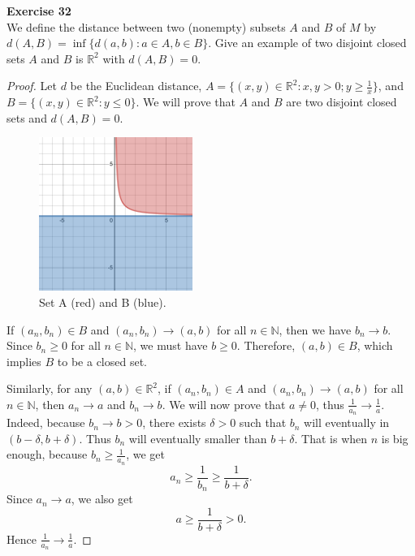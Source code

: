 \documentclass[12pt, a4paper]{article}
\theoremstyle{plain}
\newcommand{\N}{\mathbb{N}}
\newcommand{\R}{\mathbb{R}}
\newenvironment{exercise}[2][Exercise]
    { \begin{mdframed}[backgroundcolor=gray!20] \textbf{#1 #2} \\}
    {  \end{mdframed}}
\begin{document}
\begin{exercise}{32}
We define the distance between two (nonempty) subsets $A$ and $B$ of $M$ by $d(A,B)=\inf\{d(a,b):a\in A, b\in B\}$. Give an example of two disjoint closed sets $A$ and $B$ is $\R^2$ with $d(A,B)=0$.
\end{exercise}
    \begin{proof}
    Let $d$ be the Euclidean distance, $A=\{(x,y)\in\R^2: x,y> 0; y\geq \frac{1}{x}\}$, and $B=\{(x,y)\in \R^2:y\leq 0\}$. We will prove that $A$ and $B$ are two disjoint closed sets and $d(A,B)=0$.
    \begin{figure}[h]
        \centering
        \includegraphics[width=5cm]{Exercise 32.png}
        \caption{Set A (red) and B (blue).}
        \label{fig:my_label}
    \end{figure}
    
    If $(a_n,b_n)\in B$ and $(a_n,b_n)\rightarrow (a,b)$ for all $n\in \N$, then we have $b_n\rightarrow b$. Since $b_n\geq 0$ for all $n\in\N$, we must have $b\geq 0$. Therefore, $(a,b)\in B$, which implies $B$ to be a closed set.
    
    Similarly, for any $(a,b)\in \R^2$, if $(a_n,b_n)\in A$ and $(a_n,b_n)\rightarrow (a,b)$ for all $n\in\N$, then $a_n\rightarrow a$ and $b_n\rightarrow b$. We will now prove that $a\neq 0$, thus $\frac{1}{a_n}\rightarrow\frac{1}{a}$. Indeed, because $b_n\rightarrow b>0$, there exists $\delta>0$ such that $b_n$ will eventually in $(b-\delta, b+\delta)$. Thus $b_n$ will eventually smaller than $b+\delta$. That is when $n$ is big enough, because $b_n\geq \frac{1}{a_n}$, we get 
    \[
    a_n\geq \frac{1}{b_n}\geq \frac{1}{b+\delta}.
    \]
    Since $a_n\rightarrow a$, we also get 
    \[
    a\geq \frac{1}{b+\delta}>0.
    \]
    Hence $\frac{1}{a_n}\rightarrow\frac{1}{a}$.
    

\end{proof}
\end{document}
